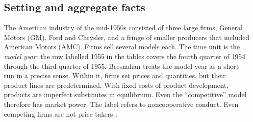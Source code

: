 \subsection{Setting and aggregate facts}\label{sec:06-bres-facts}

The American industry of the mid-1950s consisted of three large firms, General Motors (GM), Ford and Chrysler, and
a fringe of smaller producers that included American Motors (AMC). Firms sell several models each. The time unit
is the \emph{model year}: the row labelled 1955 in the tables covers the fourth quarter of 1954 through the third
quarter of 1955. Bresnahan treats the model year as a short run in a precise sense. Within it, firms set prices and
quantities, but their product lines are predetermined. With fixed costs of product development, products are
imperfect substitutes in equilibrium. Even the ``competitive'' model therefore has market power. The label refers
to noncooperative conduct. Even competing firms are not price takers \citep[p.~458]{Bresnahan1987}.


